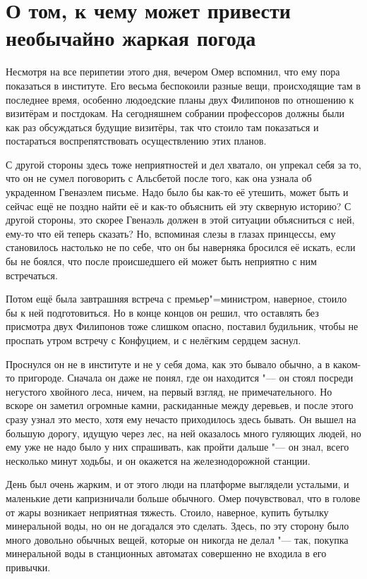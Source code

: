 \section{О том, к чему может привести необычайно жаркая погода}

Несмотря на все перипетии этого дня, вечером Омер вспомнил, что ему пора
показаться в институте.
Его весьма беспокоили разные вещи, происходящие там в последнее время, особенно
людоедские планы двух Филипонов по отношению к визитёрам и постдокам.
На сегодняшнем собрании профессоров должны были как раз обсуждаться будущие
визитёры, так что стоило там показаться и постараться воспрепятствовать
осуществлению этих планов.

С другой стороны здесь тоже неприятностей и дел хватало, он упрекал себя за то,
что он не сумел поговорить с Альсбетой после того, как она узнала об украденном
Гвенаэлем письме.
Надо было бы как-то её утешить, может быть и сейчас ещё не поздно найти её и
как-то объяснить ей эту скверную историю?
С другой стороны, это скорее Гвенаэль должен в этой ситуации объясниться с ней,
ему-то что ей теперь сказать?
Но, вспоминая слезы в глазах принцессы, ему становилось настолько не по себе,
что он бы наверняка бросился её искать, если бы не боялся, что после
происшедшего ей может быть неприятно с ним встречаться.

Потом ещё была завтрашняя встреча с премьер"=министром, наверное, стоило бы к
ней подготовиться.
Но в конце концов он решил, что оставлять без присмотра двух Филипонов тоже
слишком опасно, поставил будильник, чтобы не проспать утром встречу с Конфуцием,
и с нелёгким сердцем заснул.

Проснулся он не в институте и не у себя дома, как это бывало обычно, а в
каком-то пригороде.
Сначала он даже не понял, где он находится "--- он стоял посреди негустого
хвойного леса, ничем, на первый взгляд, не примечательного.
Но вскоре он заметил огромные камни, раскиданные между деревьев, и после этого
сразу узнал это место, хотя ему нечасто приходилось здесь бывать.
Он вышел на большую дорогу, идущую через лес, на ней оказалось много гуляющих
людей, но ему уже не надо было у них спрашивать, как пройти дальше "--- он знал,
всего несколько минут ходьбы, и он окажется на железнодорожной станции.

День был очень жарким, и от этого люди на платформе выглядели усталыми, и
маленькие дети капризничали больше обычного.
Омер почувствовал, что в голове от жары возникает неприятная тяжесть.
Стоило, наверное, купить бутылку минеральной воды, но он не догадался это
сделать.
Здесь, по эту сторону было много довольно обычных вещей, которые он никогда не
делал "--- так, покупка минеральной воды в станционных автоматах совершенно не
входила в его привычки.

